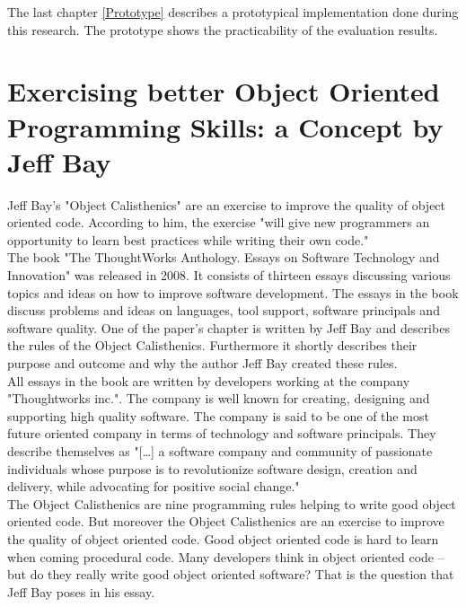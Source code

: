 The last chapter \ref{Prototype} describes a prototypical implementation done during this research. The prototype shows the practicability of the evaluation results.

\section{Exercising better Object Oriented Programming Skills: a Concept by Jeff Bay}
\label{i:exercising}
Jeff Bay's "Object Calisthenics" \cite{bay2008} are an exercise to improve the quality of object oriented code. According to him, the exercise "will give new programmers an opportunity to learn best practices while writing their own code." \cite[p. 70]{bay2008}\\

The book "The ThoughtWorks Anthology. Essays on Software Technology and Innovation" \cite[p. 70-79]{oc2008} was released in 2008. It consists of thirteen essays discussing various topics and ideas on how to improve software development. The essays in the book discuss problems and ideas on languages, tool support, software principals and software quality. One of the paper's chapter is written by Jeff Bay and describes the rules of the Object Calisthenics. Furthermore it shortly describes their purpose and outcome and why the author Jeff Bay created these rules.\\

All essays in the book \cite{oc2008} are written by developers working at the company "Thoughtworks inc.". The company is well known for creating, designing and supporting high quality software. The company is said to be one of the most future oriented company in terms of technology and software principals. They describe themselves as "[\dots] a software company and community of passionate individuals whose purpose is to revolutionize software design, creation and delivery, while advocating for positive social change." \cite{twWeb}\\

The Object Calisthenics are nine programming rules helping to write good object oriented code. But moreover the Object Calisthenics are an exercise to improve the quality of object oriented code. Good object oriented code is hard to learn when coming procedural code. Many developers think in object oriented code – but do they really write good object oriented software? That is the question that Jeff Bay poses in his essay.\\

